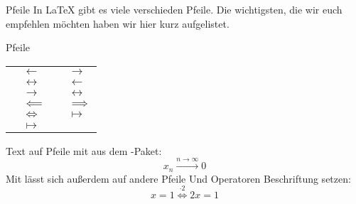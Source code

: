 
\begin{frame}[fragile]{Pfeile}
In \LaTeX{} gibt es viele verschieden Pfeile. Die wichtigsten, die wir euch empfehlen möchten haben wir hier kurz aufgelistet. 
\begin{block}{Pfeile}
\centering
\scriptsize
\begin{tabular}{*{2}{|rl}|}\hline
		 & $\leftarrow$ & 
		 & $\rightarrow$ \\
		 & $\leftrightarrow$ &
		 & $\longleftarrow$ \\
		 & $\longrightarrow$ &
		 & $\longleftrightarrow$ \\
		 & $\impliedby$ & 
		 & $\implies$ \\
		 & $\iff$ &
		 & $\mapsto$ \\
		 & $\longmapsto$ & 
		& \\ \hline
\end{tabular}
\end{block}\pause
Text auf Pfeile mit  aus dem -Paket:
\[
    x_n\xrightarrow{n\rightarrow\infty}0
\]
Mit  lässt sich außerdem auf andere Pfeile Und Operatoren Beschriftung setzen: 
\[
    x=1 \overset{\cdot2}{\iff} 2x=1
\]
\end{frame}